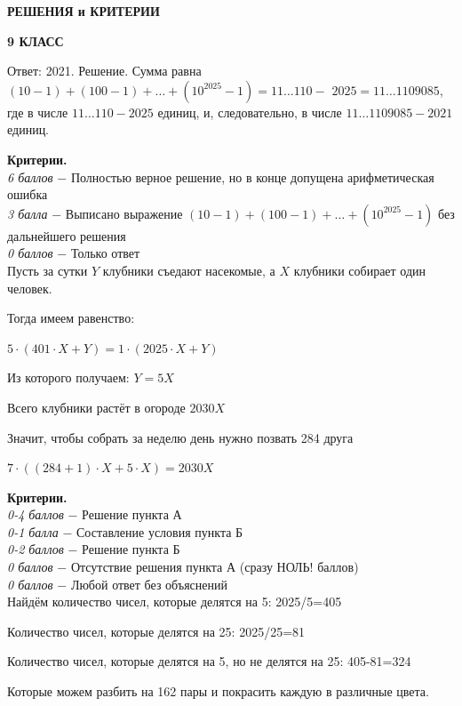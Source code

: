 \centerline{\bf \Large  РЕШЕНИЯ и КРИТЕРИИ}

\centerline{\bf \Large  9 КЛАСС}


Ответ: 2021. Решение. Сумма равна $(10-1)+(100-1)+\ldots+\left(10^{2025}-1\right)=11 \ldots 110-$ $2025=11 \ldots 1109085$, где в числе $11 \ldots 110-2025$ единиц, и, следовательно, в числе $11 \ldots 1109085-2021$ единиц.

\textbf{Критерии.} \\
\textit{6 баллов} $-$ Полностью верное решение, но в конце допущена арифметическая ошибка\\
\textit{3 балла} $-$ Выписано выражение $(10-1)+(100-1)+\ldots+\left(10^{2025}-1\right)$ без дальнейшего решения\\
\textit{0 баллов} $-$  Только ответ\\ 


 Пусть за сутки $Y$ клубники съедают насекомые, а $X$ клубники собирает один человек.

Тогда имеем равенство:

$5\cdot(401\cdot X+Y) = 1\cdot(2025\cdot X+Y)$

Из которого получаем: $Y=5X$

Всего клубники растёт в огороде $2030X$

Значит, чтобы собрать за неделю день нужно позвать 284 друга

$7\cdot((284+1)\cdot X+5\cdot X) = 2030X$
\par

\textbf{Критерии.} \\
\textit{0-4 баллов} $-$ Решение пункта А\\
\textit{0-1 балла} $-$ Составление условия пункта Б \\
\textit{0-2 баллов} $-$ Решение пункта Б\\
\textit{0 баллов} $-$ Отсутствие решения пункта А (сразу НОЛЬ! баллов)\\
\textit{0 баллов} $-$ Любой ответ без объяснений\\

 Найдём количество чисел, которые делятся на 5: 2025/5=405

Количество чисел, которые делятся на 25: 2025/25=81

Количество чисел, которые делятся на 5, но не делятся на 25: 405-81=324

Которые можем разбить на 162 пары и покрасить каждую в различные цвета.

